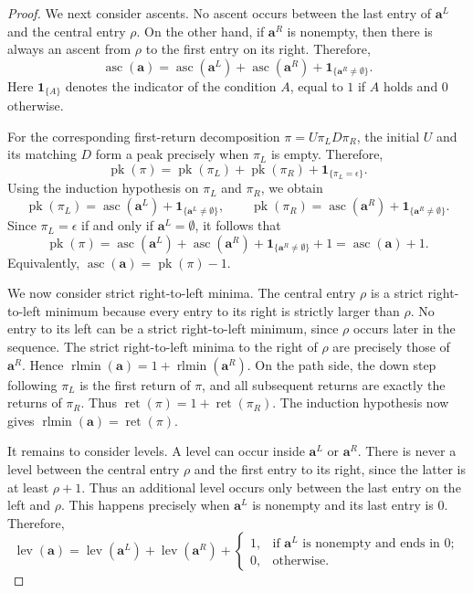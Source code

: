\documentclass[10pt,a4paper]{amsart}
\DeclareMathOperator{\asc}{asc}
\DeclareMathOperator{\lev}{lev}
\DeclareMathOperator{\pk}{pk}
\DeclareMathOperator{\ret}{ret}
\DeclareMathOperator{\rlmin}{rlmin}
\begin{document}
\begin{proof}
We next consider ascents. No ascent occurs between the last entry of
$\mathbf{a}^{L}$ and the central entry $\rho$. On the other hand, if
$\mathbf{a}^{R}$ is nonempty, then there is always an ascent from $\rho$
to the first entry on its right. Therefore,
\[
\asc(\mathbf{a})
=
\asc(\mathbf{a}^{L})
+
\asc(\mathbf{a}^{R})
+
\mathbf{1}_{\{\mathbf{a}^{R}\neq\emptyset\}}.
\]
Here $\mathbf{1}_{\{A\}}$ denotes the indicator of the condition $A$, equal to $1$ if $A$ holds and $0$ otherwise. 

For the corresponding first-return decomposition
$\pi=U\pi_LD\pi_R$, the initial $U$ and its matching $D$ form a peak
precisely when $\pi_L$ is empty. Therefore,
\[
\pk(\pi)
=
\pk(\pi_L)
+
\pk(\pi_R)
+
\mathbf{1}_{\{\pi_L=\epsilon\}}.
\]
Using the induction hypothesis on $\pi_L$ and $\pi_R$, we obtain
\[
\pk(\pi_L)
=
\asc(\mathbf a^L)
+
\mathbf{1}_{\{\mathbf a^L\neq\emptyset\}},
\qquad
\pk(\pi_R)
=
\asc(\mathbf a^R)
+
\mathbf{1}_{\{\mathbf a^R\neq\emptyset\}}.
\]
Since $\pi_L=\epsilon$ if and only if $\mathbf a^L=\emptyset$, it follows that
\[
\pk(\pi)
=
\asc(\mathbf a^L)
+
\asc(\mathbf a^R)
+
\mathbf{1}_{\{\mathbf a^R\neq\emptyset\}}
+1
=
\asc(\mathbf a)+1.
\]
Equivalently, $\asc(\mathbf{a})=\pk(\pi)-1$.

We now consider strict right-to-left minima. The central entry $\rho$ is
a strict right-to-left minimum because every entry to its right is
strictly larger than $\rho$. No entry to its left can be a strict
right-to-left minimum, since $\rho$ occurs later in the sequence. The strict
right-to-left minima to the right of $\rho$ are precisely those of
$\mathbf{a}^{R}$. Hence $\rlmin(\mathbf{a})
=
1+\rlmin(\mathbf{a}^{R})$. On the path side, the down step following $\pi_L$ is the first return of
$\pi$, and all subsequent returns are exactly the returns of $\pi_R$.
Thus $
\ret(\pi)
=
1+\ret(\pi_R)$. The induction hypothesis now gives $\rlmin(\mathbf{a})=\ret(\pi)$.

It remains to consider levels. A level can occur inside
$\mathbf{a}^{L}$ or $\mathbf{a}^{R}$. There is never a level between
the central entry $\rho$ and the first entry to its right, since the
latter is at least $\rho+1$. Thus an additional level occurs only
between the last entry on the left and $\rho$. This happens precisely
when $\mathbf{a}^{L}$ is nonempty and its last entry is $0$. Therefore,
\[
\lev(\mathbf{a})
=
\lev(\mathbf{a}^{L})
+
\lev(\mathbf{a}^{R})
+
\begin{cases}
1, & \text{if $\mathbf{a}^{L}$ is nonempty and ends in $0$};\\
0, & \text{otherwise}.
\end{cases}
\]


\end{proof}
\end{document}
